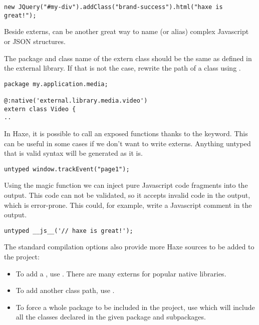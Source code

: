 \begin{lstlisting}
new JQuery("#my-div").addClass("brand-success").html("haxe is great!");
\end{lstlisting}

Beside externs,  can be another great way to name (or alias) complex Javascript or JSON structures.

The package and class name of the extern class should be the same as defined in the external library. If that is not the case, rewrite the path of a class using .

\begin{lstlisting}
package my.application.media;

@:native('external.library.media.video')
extern class Video {
..
\end{lstlisting}

In Haxe, it is possible to call an exposed functions thanks to the  keyword. This can be useful in some cases if we don't want to write externs. Anything untyped that is valid syntax will be generated as it is.

\begin{lstlisting}
untyped window.trackEvent("page1");  
\end{lstlisting}

Using the magic  function we can inject pure Javascript code fragments into the output. This code can not be validated, so it accepts invalid code in the output, which is error-prone.
This could, for example, write a Javascript comment in the output.

\begin{lstlisting}
untyped __js__('// haxe is great!');
\end{lstlisting}

The standard compilation options also provide more Haxe sources to be added to the project:

\begin{itemize}
	\item To add a , use . There are many externs for popular native libraries.
	\item To add another class path, use .
	\item To force a whole package to be included in the project, use  which will include all the classes declared in the given package and subpackages. 
\end{itemize}

